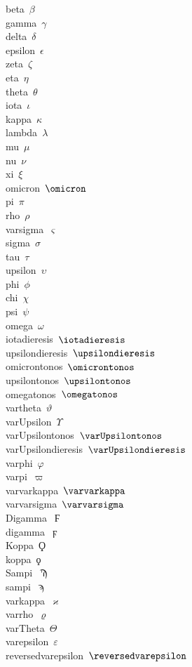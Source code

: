 \documentclass[a4paper,12pt]{article}
\begin{document}
\begin{multicols}{4}
beta\ $\beta$\\
gamma\ $\gamma$\\
delta\ $\delta$\\
epsilon\ $\epsilon$\\
zeta\ $\zeta$\\
eta\ $\eta$\\
theta\ $\theta$\\
iota\ $\iota$\\
kappa\ $\kappa$\\
lambda\ $\lambda$\\
mu\ $\mu$\\
nu\ $\nu$\\
xi\ $\xi$\\
omicron\ $\omicron$\\
pi\ $\pi$\\
rho\ $\rho$\\
varsigma\ $\varsigma$\\
sigma\ $\sigma$\\
tau\ $\tau$\\
upsilon\ $\upsilon$\\
phi\ $\phi$\\
chi\ $\chi$\\
psi\ $\psi$\\
omega\ $\omega$\\
iotadieresis\ $\iotadieresis$\\
upsilondieresis\ $\upsilondieresis$\\
omicrontonos\ $\omicrontonos$\\
upsilontonos\ $\upsilontonos$\\
omegatonos\ $\omegatonos$\\
vartheta\ $\vartheta$\\
varUpsilon\ $\varUpsilon$\\
varUpsilontonos\ $\varUpsilontonos$\\
varUpsilondieresis\ $\varUpsilondieresis$\\
varphi\ $\varphi$\\
varpi\ $\varpi$\\
varvarkappa\ $\varvarkappa$\\
varvarsigma\ $\varvarsigma$\\
Digamma\ $\Digamma$\\
digamma\ $\digamma$\\
Koppa\ $\Koppa$\\
koppa\ $\koppa$\\
Sampi\ $\Sampi$\\
sampi\ $\sampi$\\
varkappa\ $\varkappa$\\
varrho\ $\varrho$\\
varTheta\ $\varTheta$\\
varepsilon\ $\varepsilon$\\
reversedvarepsilon\ $\reversedvarepsilon$\\
\end{multicols}
\end{document}

